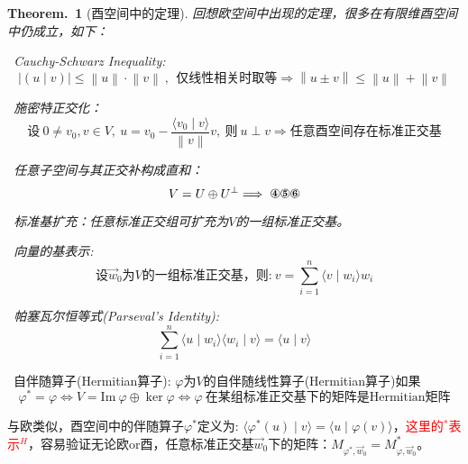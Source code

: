 \documentclass[zihao=-4,UTF8]{report}
\theoremstyle{mystyle} %
\newtheorem{theorem}{Theorem.\,}
\begin{document}
\begin{theorem}[酉空间中的定理]\label{酉空间中的定理}
回想欧空间中出现的定理，很多在有限维酉空间中仍成立，如下：
\par
{}\ Cauchy-Schwarz Inequality: 
\begin{equation*}
    |(u\mid v) | \le \left \| u \right \|\cdot\left \| v \right \| \ ,\ \ \text{仅线性相关时取等}\Longrightarrow \left \| u \pm v \right \| \le \left \| u \right \| + \left \| v \right \|
\end{equation*}\par
{}\ 施密特正交化：
\begin{equation*}
    \text{设}\ 0 \ne v_0, v \in V,\ u = v_0 - \frac{\langle v_0\mid v\rangle }{ \left \| v \right \| }v,\ \text{则}\ u\perp v \Longrightarrow \text{任意酉空间存在标准正交基}
\end{equation*}\par
{}\ 任意子空间与其正交补构成直和：
\begin{equation*}
    V = U\oplus U^{\perp} \Longrightarrow\  \text{\ding{175}\ding{176}\ding{177}}
\end{equation*}    \par
{}\ 标准基扩充：任意标准正交组可扩充为$V$的一组标准正交基。\par
{}\ 向量的基表示:
\begin{equation*}
    \text{设$\vec{w}_0$为$V$的一组标准正交基，则:}\ v = \sum_{i=1}^{n}\langle v \mid w_i \rangle w_i
\end{equation*}    \par
{}\ 帕塞瓦尔恒等式(Parseval's Identity):
\begin{equation*}
    \sum_{i=1}^{n} \langle u \mid w_i \rangle \langle w_i  \mid v \rangle = \langle u \mid v \rangle
\end{equation*}    \par
\end{theorem}
\ 自伴随算子(Hermitian算子):
$\varphi$为$V$的自伴随线性算子(Hermitian算子)如果
\begin{equation*}
    \varphi^* = \varphi \Longleftrightarrow V = \text{Im}\ \varphi \oplus \ker \varphi \Longleftrightarrow \varphi\ \text{在某组标准正交基下的矩阵是Hermitian矩阵}    
\end{equation*}
{\par\color{gray}\small
与欧类似，酉空间中的伴随算子$\varphi^*$定义为: $\langle \varphi^*(u) \mid v \rangle = \langle u \mid \varphi(v) \rangle$，\textcolor{red}{这里的$^*$表示$^H$}，容易验证无论欧or酉，任意标准正交基$\vec{w}_0$下的矩阵：$M_{\varphi^*,\vec{w}_0}  = M_{\varphi,\vec{w}_0}^* $。\par}
\end{document}
